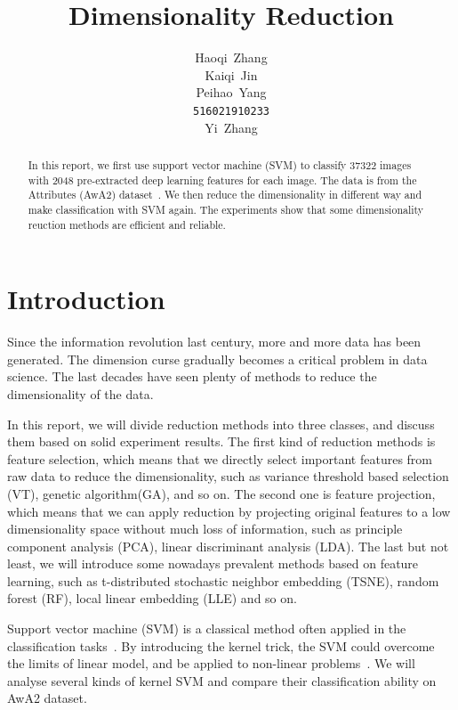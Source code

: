 \documentclass{article}
\title{Dimensionality Reduction}
\author{
  Haoqi~Zhang\\
  \And
  Kaiqi~Jin\\
  \And
  Peihao~Yang\\
  \texttt{516021910233} \\
  \And
  Yi~Zhang\\
}
\begin{document}
\maketitle

\begin{abstract}
In this report, we first use support vector machine (SVM) to classify 37322 images with 2048 pre-extracted deep learning features for each image. The data is from the Attributes (AwA2) dataset~\cite{AwA2}. We then reduce the dimensionality in different way and make classification with SVM again. The experiments show that some dimensionality reuction methods are efficient and reliable.
\end{abstract}




\section{Introduction}
Since the information revolution last century, more and more data has been generated. The dimension curse gradually becomes a critical problem in data science. The last decades have seen plenty of methods to reduce the dimensionality of the data. 

In this report, we will divide reduction methods into three classes, and discuss them based on solid experiment results. The first kind of reduction methods is feature selection, which means that we directly select important features from raw data to reduce the dimensionality, such as variance threshold based selection (VT), genetic algorithm(GA), and so on. The second one is feature projection, which means that we can apply reduction by projecting original features to a low dimensionality space without much loss of information, such as principle component analysis (PCA), linear discriminant analysis (LDA). The last but not least, we will introduce some nowadays prevalent methods based on feature learning, such as t-distributed stochastic neighbor embedding (TSNE), random forest (RF), local linear embedding (LLE) and so on.

Support vector machine (SVM) is a classical method often applied in the classification tasks~\cite{SVM}. By introducing the kernel trick, the SVM could overcome the limits of linear model, and be applied to non-linear problems~\cite{}. We will analyse several kinds of kernel SVM and compare their classification ability on AwA2 dataset.
\end{document}
